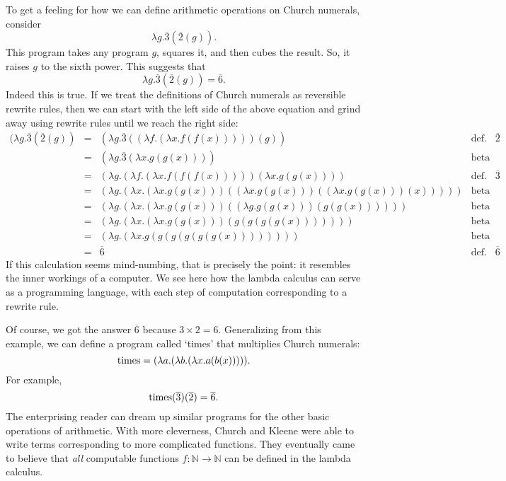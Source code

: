 \documentclass[12pt]{article}
\newcommand{\NN}{\mathbb{N}}
\newcommand{\maps}{\colon}
\newcommand{\Times}{{\rm times}}
\begin{document}
To get a feeling for how we can define arithmetic operations on 
Church numerals, consider
\[          \lambda g . \overline{3}(\overline{2}(g))  . \]
This program takes any program $g$, squares it, and then cubes the result.
So, it raises $g$ to the sixth power.  This suggests that
\[       \lambda g . \overline{3}(\overline{2}(g)) = \overline{6} . \]
Indeed this is true.  If we treat the definitions of Church numerals
as reversible rewrite rules, then we can start with the left side of
the above equation and grind away using rewrite rules until we reach
the right side:
\[
\begin{array}{ccll}
 (\lambda g . \overline{3} (\overline{2} (g))
 &=& (\lambda g . \overline{3} ((\lambda f . (\lambda x . f(f(x))))) (g)) 
  & \textrm{def.\ of } \overline{2} \\
 &=& (\lambda g . \overline{3} (\lambda x . g(g(x))))  
  & \textrm{beta} \\
 &=& (\lambda g . (\lambda f . (\lambda x . f(f(f(x))))) 
     (\lambda x . g(g(x)))) 
  & \textrm{def.\ of } \overline{3} \\
 &=& (\lambda g . (\lambda x . (\lambda x . g(g(x)))
     ((\lambda x . g(g(x))) ((\lambda x . g(g(x))) (x))))) 
  & \textrm{beta} \\
 &=& (\lambda g . (\lambda x . (\lambda x. g(g(x)))
     ((\lambda g . g(g(x))) (g(g(x))))))
  & \textrm{beta} \\
 &=& (\lambda g . (\lambda x . (\lambda x . g(g(x))) (g(g(g(g(x))))))) 
  & \textrm{beta} \\
 &=& (\lambda g . (\lambda x . g(g(g(g(g(g(x))))))))  
  & \textrm{beta} \\
 &=& \overline{6} 
   & \textrm{def.\ of } \overline{6} 
\end{array}
\]
If this calculation seems mind-numbing, that is precisely the point:
it resembles the inner workings of a computer.  We see here how the
lambda calculus can serve as a programming language, with each step of
computation corresponding to a rewrite rule.

Of course, we got the answer $\overline{6}$ because $3 \times 2 = 6$. 
Generalizing from this example, we can define a program called `times' that
multiplies Church numerals:
\[    \Times = (\lambda a . (\lambda b . (\lambda x . a(b(x))))) .\]
For example, 
\[
\Times(\overline{3})(\overline{2}) = \overline{6} .
\]
The enterprising reader can dream up similar programs for the other
basic operations of arithmetic.  With more cleverness, Church and
Kleene were able to write terms corresponding to more complicated
functions.  They eventually came to believe that {\it all} computable
functions $f \maps \NN \to \NN$ can be defined in the lambda calculus.
\end{document}
